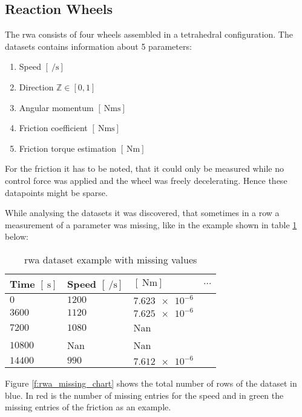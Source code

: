 \subsection{Reaction Wheels}
The \acf{rwa} consists of four wheels assembled in a tetrahedral configuration. The datasets contains information about 5 parameters:

\begin{enumerate}
\item Speed $[\SI{}{\per\second}]$
\item Direction $\mathbb{Z} \in [0, 1]$
\item Angular momentum $[\SI{}{\newton\meter\second}]$
\item Friction coefficient $[\SI{}{\newton\meter\second}]$
\item Friction torque estimation $[\SI{}{\newton\meter}]$
\end{enumerate}

For the friction it has to be noted, that it could only be measured while no control force was applied and the wheel was freely decelerating. Hence these datapoints might be sparse.

While analysing the datasets it was discovered, that sometimes in a row a measurement of a parameter was missing, like in the example shown in table \ref{t:rwa_missing} below:

\begin{table}[htb]
\centering
\begin{tabular}{b{}b{}b{}b{}}
\toprule
Time $[\SI{}{\second}]$	& Speed  $[\SI{}{\per\second}]$		& $[\SI{}{\newton\meter}]$	& $\hdots$ \\ \midrule
$\num{0}$				& $\num{1200}$						& $\num{7.623e-6}$			&			\\
$\num{3600}$				& $\num{1120}$						& $\num{7.625e-6}$			&			\\
$\num{7200}$				& $\num{1080}$						& Nan						&			\\
$\num{10800}$			& Nan								& Nan						&			\\
$\num{14400}$			& $\num{990}$						& $\num{7.612e-6}$			&			\\ \bottomrule
\end{tabular}
\caption{\ac{rwa} dataset example with missing values}
\label{t:rwa_missing}
\end{table}


Figure \ref{f:rwa_missing_chart} shows the total number of rows of the dataset in blue. In red is the number of missing entries for the speed and in green the missing entries of the friction as an example. 

